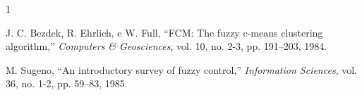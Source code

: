 \documentclass[journal]{IEEEtran}
\begin{document}
\begin{thebibliography}{1}

J. C. Bezdek, R. Ehrlich, e W. Full, ``FCM: The fuzzy c-means clustering algorithm,'' \textit{Computers \& Geosciences}, vol. 10, no. 2-3, pp. 191--203, 1984.

M. Sugeno, ``An introductory survey of fuzzy control,'' \textit{Information Sciences}, vol. 36, no. 1-2, pp. 59--83, 1985.


\end{thebibliography}
\newpage
\newpage
\end{document}
